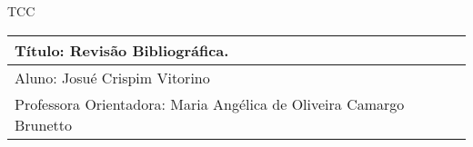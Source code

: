 

\begin{center}
TCC

\begin{tabular}{|l|l|}
\hline

T\'itulo: Revisão Bibliográfica. \\ 

\hline
Aluno: Josué Crispim Vitorino \\ 
\hline
Professora Orientadora:  Maria Ang\'elica de Oliveira Camargo Brunetto \\ 
\hline
\end{tabular}\\


\end{center}
